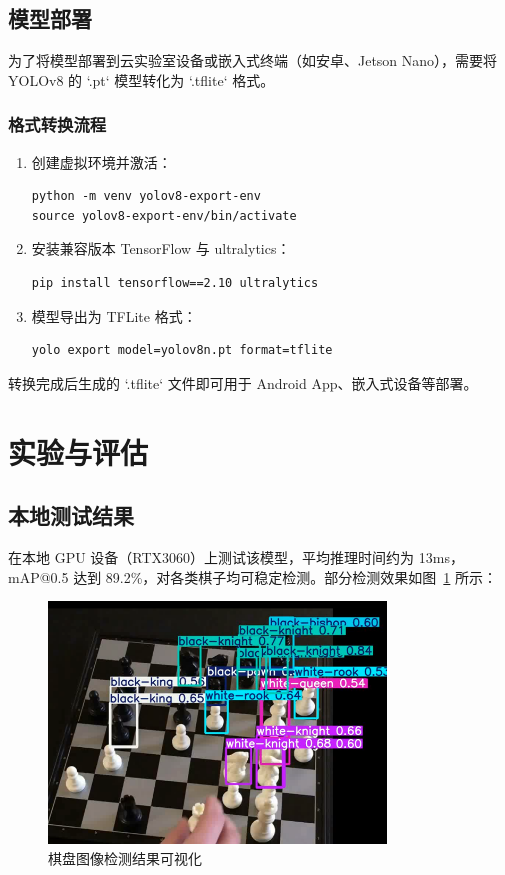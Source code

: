 \documentclass[UTF8,zihao=-4]{oucart}
\begin{document}
\subsection{模型部署}

为了将模型部署到云实验室设备或嵌入式终端（如安卓、Jetson Nano），需要将 YOLOv8 的 `.pt` 模型转化为 `.tflite` 格式。

\subsubsection{格式转换流程}
\begin{enumerate}
    \item 创建虚拟环境并激活：
    \begin{lstlisting}
python -m venv yolov8-export-env
source yolov8-export-env/bin/activate
    \end{lstlisting}
    
    \item 安装兼容版本 TensorFlow 与 ultralytics：
    \begin{lstlisting}
pip install tensorflow==2.10 ultralytics
    \end{lstlisting}
    
    \item 模型导出为 TFLite 格式：
    \begin{lstlisting}
yolo export model=yolov8n.pt format=tflite
    \end{lstlisting}
\end{enumerate}

转换完成后生成的 `.tflite` 文件即可用于 Android App、嵌入式设备等部署。

\section{实验与评估}

\subsection{本地测试结果}

在本地 GPU 设备（RTX3060）上测试该模型，平均推理时间约为 13ms，mAP@0.5 达到 89.2\%，对各类棋子均可稳定检测。部分检测效果如图~\ref{fig:result} 所示：

\begin{figure}[h]
    \centering
    \includegraphics[width=0.8\textwidth]{assets/图片1.png}
    \caption{棋盘图像检测结果可视化}
    \label{fig:result}
\end{figure}
\end{document}
